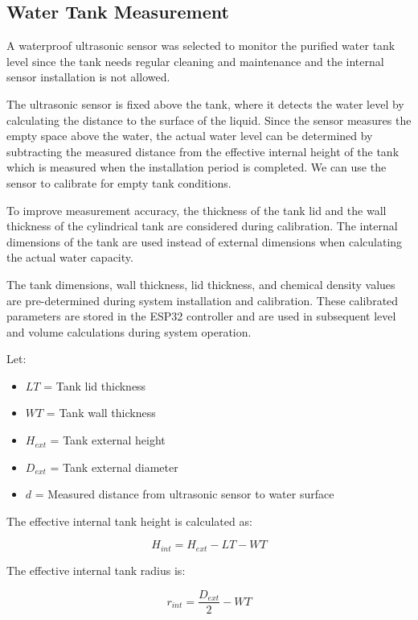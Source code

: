 \documentclass[12pt,a4paper]{report}
\begin{document}
\subsection{Water Tank Measurement}

A waterproof ultrasonic sensor was selected to monitor the purified water tank level since the tank needs regular cleaning and maintenance and the internal sensor installation is not allowed.

The ultrasonic sensor is fixed above the tank, where it detects the water level by calculating the distance to the surface of the liquid. Since the sensor measures the empty space above the water, the actual water level can be determined by subtracting the measured distance from the effective internal height of the tank which is measured when the installation period is completed. We can use the sensor to calibrate for empty tank conditions.

To improve measurement accuracy, the thickness of the tank lid and the wall thickness of the cylindrical tank are considered during calibration. The internal dimensions of the tank are used instead of external dimensions when calculating the actual water capacity.

The tank dimensions, wall thickness, lid thickness, and chemical density values are pre-determined during system installation and calibration. These calibrated parameters are stored in the ESP32 controller and are used in subsequent level and volume calculations during system operation.

\noindent Let:

\begin{itemize}
    \item $LT$ = Tank lid thickness
    \item $WT$ = Tank wall thickness
    \item $H_{ext}$ = Tank external height
    \item $D_{ext}$ = Tank external diameter
    \item $d$ = Measured distance from ultrasonic sensor to water surface
\end{itemize}

The effective internal tank height is calculated as:

\begin{equation}
H_{int} = H_{ext} - LT - WT
\end{equation}

The effective internal tank radius is:

\begin{equation}
r_{int} = \frac{D_{ext}}{2} - WT
\end{equation}
\end{document}
